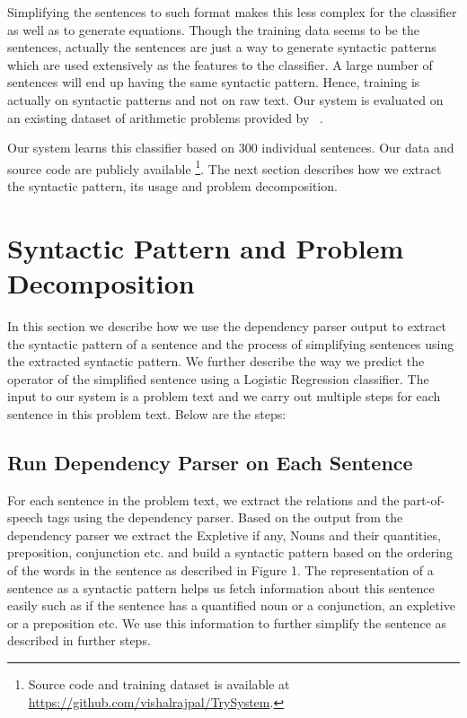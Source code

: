 \documentclass[11pt]{article}
\begin{document}
Simplifying the sentences to such format makes this less complex for the classifier as well as to generate equations. Though the training data seems to be the sentences, actually the sentences are just a way to generate syntactic patterns which are used extensively as the features to the classifier. A large number of sentences will end up having the same syntactic pattern. Hence, training is actually on syntactic patterns and not on raw text. Our system is evaluated on an existing dataset of arithmetic problems provided by ~\cite{Hosseini:14}. \newline

Our system learns this classifier based on 300 individual sentences. Our data and source code are publicly available \footnote{Source code and training dataset is available at \url{https://github.com/vishalrajpal/TrySystem}.}. The next section describes how we extract the syntactic pattern, its usage and problem decomposition.


\section{Syntactic Pattern and Problem Decomposition}
\label{method}
In this section we describe how we use the dependency parser output to extract the syntactic pattern of a sentence and the process of simplifying sentences using the extracted syntactic pattern. We further describe the way we predict the operator of the simplified sentence using a Logistic Regression classifier. The input to our system is a problem text and we carry out multiple steps for each sentence in this problem text. Below are the steps:

\subsection{Run Dependency Parser on Each Sentence}
For each sentence in the problem text, we extract the relations and the part-of-speech tags using the dependency parser. Based on the output from the dependency parser we extract the Expletive if any, Nouns and their quantities, preposition, conjunction etc. and build a syntactic pattern based on the ordering of the words in the sentence as described in Figure 1. The representation of a sentence as a syntactic pattern helps us fetch information about this sentence easily such as if the sentence has a quantified noun or a conjunction, an expletive or a preposition etc. We use this information to further simplify the sentence as described in further steps. 
\end{document}
